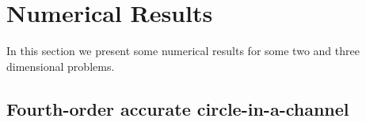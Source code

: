 \documentclass{article}
\begin{document}




\clearpage




\clearpage
\section{Numerical Results}\label{sec:numericalResults}

In this section we present some numerical results for some
two and three dimensional problems.



\clearpage
\subsection{Fourth-order accurate circle-in-a-channel}
\end{document}
